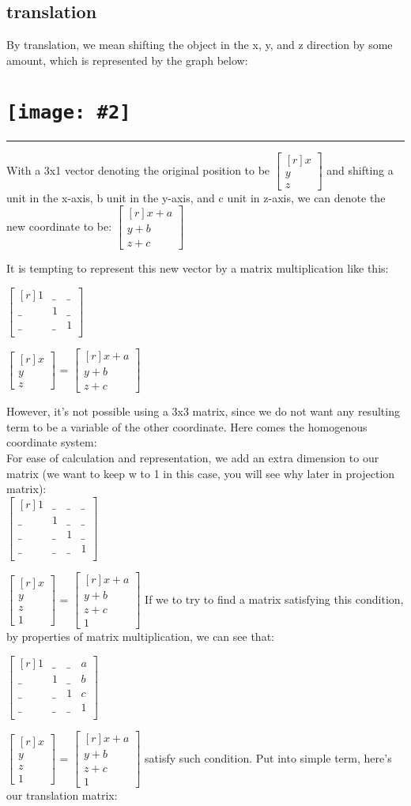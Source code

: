 \documentclass[11pt]{article}
\newcommand{\image}[2]{\texttt{[image: \#2]}}
\newcommand{\mysection}[1]{
    \section*{#1}
    \hrule
    \vspace*{0.5cm}
}
\newcommand{\mat}[1]{
    $\begin{bmatrix*}[r]
        #1
    \end{bmatrix*}$
} %
\newcommand{\gap}{\vspace*{0.5cm}}
\begin{document}
\subsection{translation}
By translation, we mean shifting the object in the x, y, and z direction by some amount, which is represented by the graph below: \\
\mysection{
    \image{0.5}{translation}{}
}
With a 3x1 vector denoting the original position to be \mat{x\\y\\z} and shifting a unit in the x-axis, b unit in the y-axis, and c unit in z-axis, we can denote the new coordinate to be: \mat{x + a \\ y + b \\ z + c}
It is tempting to represent this new vector by a matrix multiplication like this: 
\mat{
    1 & \_ & \_ \\
    \_ & 1 & \_ \\
    \_ & \_ & 1 \\
} \mat {x \\ y \\ z} = \mat{x + a \\ y + b \\ z + c}
However, it's not possible using a 3x3 matrix, since we do not want any resulting term to be a variable of the other coordinate. Here comes the homogenous coordinate system: \\
For ease of calculation and representation, we add an extra dimension to our matrix (we want to keep w to 1 in this case, you will see why later in projection matrix): \gap \\
\mat{
    1 & \_ & \_ & \_\\
    \_ & 1 & \_ & \_\\
    \_ & \_ & 1 & \_\\
    \_ & \_ & \_ & 1 \\
} \mat {x \\ y \\ z \\ 1} = \mat{x + a \\ y + b \\ z + c \\ 1} If we to try to find a matrix satisfying this condition, by properties of matrix multiplication, we can see that:
\mat{
    1 & \_ & \_ & a\\
    \_ & 1 & \_ & b\\
    \_ & \_ & 1 & c\\
    \_ & \_ & \_ & 1 \\
} \mat {x \\ y \\ z \\ 1} = \mat{x + a \\ y + b \\ z + c \\ 1} satisfy such condition. Put into simple term, here's our translation matrix: \gap \\
\end{document}
